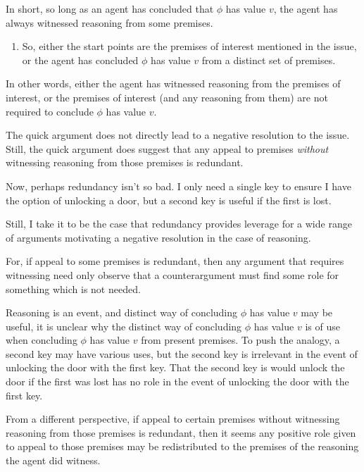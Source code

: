\begin{note}
  In short, so long as an agent has concluded that \(\phi\) has value \(v\), the agent has always witnessed reasoning from some premises.

  \begin{enumerate}[resume]
  \item So, either the start points are the premises of interest mentioned in the issue, or the agent has concluded \(\phi\) has value \(v\) from a distinct set of premises.
  \end{enumerate}

  In other words, either the agent has witnessed reasoning from the premises of interest, or the premises of interest (and any reasoning from them) are not required to conclude \(\phi\) has value \(v\).
\end{note}

\begin{note}
  The quick argument does not directly lead to a negative resolution to the issue.
  Still, the quick argument does suggest that any appeal to premises \emph{without} witnessing reasoning from those premises is redundant.

  Now, perhaps redundancy isn't so bad.
  I only need a single key to ensure I have the option of unlocking a door, but a second key is useful if the first is lost.

  Still, I take it to be the case that redundancy provides leverage for a wide range of arguments motivating a negative resolution in the case of reasoning.

  For, if appeal to some premises is redundant, then any argument that requires witnessing need only observe that a counterargument must find some role for something which is not needed.

  Reasoning is an event, and distinct way of concluding \(\phi\) has value \(v\) may be useful, it is unclear why the distinct way of concluding \(\phi\) has value \(v\) is of use when concluding \(\phi\) has value \(v\) from present premises.
  To push the analogy, a second key may have various uses, but the second key is irrelevant in the event of unlocking the door with the first key.
  That the second key is would unlock the door if the first was lost has no role in the event of unlocking the door with the first key.

  From a different perspective, if appeal to certain premises without witnessing reasoning from those premises is redundant, then it seems any positive role given to appeal to those premises may be redistributed to the premises of the reasoning the agent did witness.


\end{note}
